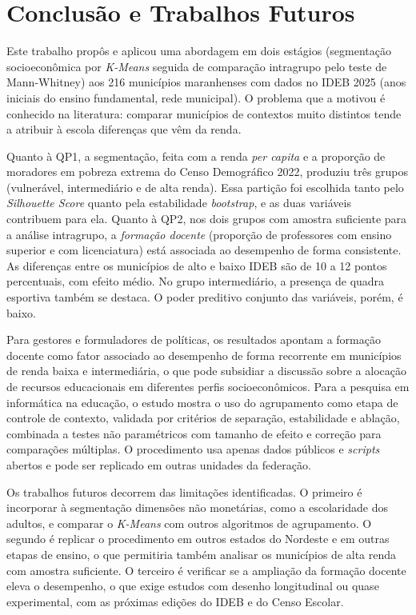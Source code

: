 \section{Conclusão e Trabalhos Futuros}
\label{sec:conclusion}

Este trabalho propôs e aplicou uma abordagem em dois estágios (segmentação socioeconômica por \textit{K-Means} seguida de comparação intragrupo pelo teste de Mann-Whitney) aos 216 municípios maranhenses com dados no IDEB 2025 (anos iniciais do ensino fundamental, rede municipal). O problema que a motivou é conhecido na literatura: comparar municípios de contextos muito distintos tende a atribuir à escola diferenças que vêm da renda.

Quanto à QP1, a segmentação, feita com a renda \textit{per capita} e a proporção de moradores em pobreza extrema do Censo Demográfico 2022, produziu três grupos (vulnerável, intermediário e de alta renda). Essa partição foi escolhida tanto pelo \textit{Silhouette Score} quanto pela estabilidade \textit{bootstrap}, e as duas variáveis contribuem para ela. Quanto à QP2, nos dois grupos com amostra suficiente para a análise intragrupo, a \textit{formação docente} (proporção de professores com ensino superior e com licenciatura) está associada ao desempenho de forma consistente. As diferenças entre os municípios de alto e baixo IDEB são de 10 a 12 pontos percentuais, com efeito médio. No grupo intermediário, a presença de quadra esportiva também se destaca. O poder preditivo conjunto das variáveis, porém, é baixo.

Para gestores e formuladores de políticas, os resultados apontam a formação docente como fator associado ao desempenho de forma recorrente em municípios de renda baixa e intermediária, o que pode subsidiar a discussão sobre a alocação de recursos educacionais em diferentes perfis socioeconômicos. Para a pesquisa em informática na educação, o estudo mostra o uso do agrupamento como etapa de controle de contexto, validada por critérios de separação, estabilidade e ablação, combinada a testes não paramétricos com tamanho de efeito e correção para comparações múltiplas. O procedimento usa apenas dados públicos e \textit{scripts} abertos e pode ser replicado em outras unidades da federação.

Os trabalhos futuros decorrem das limitações identificadas. O primeiro é incorporar à segmentação dimensões não monetárias, como a escolaridade dos adultos, e comparar o \textit{K-Means} com outros algoritmos de agrupamento. O segundo é replicar o procedimento em outros estados do Nordeste e em outras etapas de ensino, o que permitiria também analisar os municípios de alta renda com amostra suficiente. O terceiro é verificar se a ampliação da formação docente eleva o desempenho, o que exige estudos com desenho longitudinal ou quase experimental, com as próximas edições do IDEB e do Censo Escolar.
